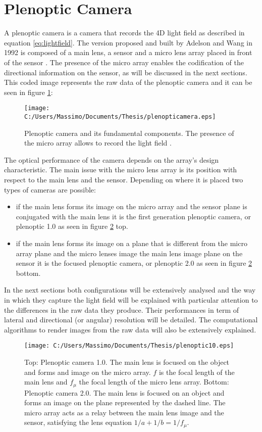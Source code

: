 \section{Plenoptic Camera}
\label{sec:plenoticcamera}
A plenoptic camera is a camera that records the 4D light field as described in equation \ref{eq:lightfield}. The version proposed and built by Adelson and Wang in 1992 \cite{adelson1992single} is composed of a main lens, a sensor and a micro lens array placed in front of the sensor \cite{adelson1992single}. The presence of the micro array enables the codification of the directional information on the sensor, as will be discussed in the next sections. This coded image represents the raw data of the plenoptic camera and it can be seen in figure \ref{fig:plenoptic1}: 
\begin{figure}[H]
	\centering
	\texttt{[image: C:/Users/Massimo/Documents/Thesis/plenopticamera.eps]}
	\caption{\label{fig:plenoptic1} Plenoptic camera and its fundamental components. The presence of the micro array allows to record the light field .}
\end{figure}
The optical performance of the camera depends on the array's design characteristic. The main issue with the micro lens array is its position with respect to the main lens and the sensor. Depending on where it is placed two types of cameras are possible:
\begin{itemize}
	\item if the main lens forms its image on the micro array and the sensor plane is conjugated with the main lens it is the first generation plenoptic camera, or plenoptic 1.0 \cite{ng2005light} as seen in figure \ref{fig:plenoptic2} top.
	\item if the main lens forms its image on a plane that is different from the micro array plane and the micro lenses image the main lens image plane on the sensor it is the focused plenoptic camera, or plenoptic 2.0 \cite{georgiev2010focused} as seen in figure \ref{fig:plenoptic2} bottom.
\end{itemize}
 In the next sections both configurations will be extensively analysed and the way in which they capture the light field will be explained with particular attention to the differences in the raw data they produce. Their performances in term of lateral and directional (or angular) resolution will be detailed. The computational algorithms to render images from the raw data will also be extensively explained.
\begin{figure}[H]
	\centering
	\texttt{[image: C:/Users/Massimo/Documents/Thesis/plenoptic10.eps]}
	\caption{\label{fig:plenoptic2}Top: Plenoptic camera 1.0. The main lens is focused on the object and forms and image on the micro array. $f$ is the focal length of the main lens and $f_\mu$ the focal length of the micro lens array. Bottom: Plenoptic camera 2.0. The main lens is focused on an object and forms an image on the plane represented by the dashed line. The micro array acts as a relay between the main lens image and the sensor, satisfying the lens equation $1/a+1/b=1/f_\mu$.}
\end{figure}
